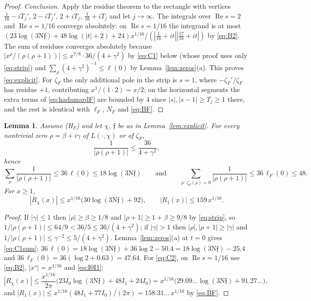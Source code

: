 \documentclass[11pt]{article}
\newtheorem{lemma}{Lemma}[section]
\theoremstyle{definition}
\theoremstyle{remark}
\numberwithin{equation}{section}
\newcommand{\ff}{\mathfrak f}
\newcommand{\Nm}{\mathrm N}
\newcommand{\Rea}{\operatorname{Re}}
\newcommand{\HF}{\textup{(H$_F$)}}
\begin{document}
\begin{proof}
\emph{Conclusion.} Apply the residue theorem to the rectangle with vertices $\tfrac1{16}-iT_j'$, $2-iT_j'$, $2+iT_j$, $\tfrac1{16}+iT_j$ and let $j\to\infty$. The integrals over $\Rea s=2$ and $\Rea s=1/16$ converge absolutely: on $\Rea s=1/16$ the integrand is at most $(23\log(3\Nm\ff)+48\log(|t|+2)+24)x^{1/16}/(|\tfrac1{16}+it||\tfrac{17}{16}+it|)$ by \eqref{eq:B2}. The sum of residues converges absolutely because $|x^\rho/(\rho(\rho+1))|\le x^{7/8}\cdot36/(4+\gamma^2)$ by \eqref{eq:C1} below (whose proof uses only \eqref{eq:strip}) and $\sum_\rho(4+\gamma^2)^{-1}\le\ell(0)$ by Lemma~\ref{lem:zeros}(a). This proves \eqref{eq:explicit}. For $\zeta_F$ the only additional pole in the strip is $s=1$, where $-\zeta_F'/\zeta_F$ has residue $+1$, contributing $x^1/(1\cdot2)=x/2$; on the horizontal segments the extra terms of \eqref{eq:hadamardF} are bounded by $4$ since $|s|,|s-1|\ge T_j\ge1$ there, and the rest is identical with $\ell_F$, $N_F$ and \eqref{eq:BF}.
\end{proof}

\begin{lemma}\label{lem:bounds}
Assume \HF{} and let $\chi$, $\ff$ be as in Lemma~\ref{lem:explicit}. For every nontrivial zero $\rho=\beta+i\gamma$ of $L(\cdot,\chi)$ or of $\zeta_F$,
\begin{equation}\label{eq:C1}
 \frac1{|\rho(\rho+1)|}\le\frac{36}{4+\gamma^2},
\end{equation}
hence
\begin{equation}\label{eq:C1sum}
 \sum_\rho\frac1{|\rho(\rho+1)|}\le36\,\ell(0)\le18\log(3\Nm\ff)\qquad\text{and}\qquad\sum_{\rho:\,\zeta_F(\rho)=0}\frac1{|\rho(\rho+1)|}\le36\,\ell_F(0)\le48 .
\end{equation}
For $x\ge1$,
\begin{equation}\label{eq:C2}
 |R_\chi(x)|\le x^{1/16}\bigl(30\log(3\Nm\ff)+92\bigr),\qquad|R_1(x)|\le159\,x^{1/16}.
\end{equation}
\end{lemma}

\begin{proof}
If $|\gamma|\le1$ then $|\rho|\ge\beta\ge1/8$ and $|\rho+1|\ge1+\beta\ge9/8$ by \eqref{eq:strip}, so $1/|\rho(\rho+1)|\le64/9<36/5\le36/(4+\gamma^2)$; if $|\gamma|>1$ then $|\rho|,|\rho+1|\ge|\gamma|$ and $1/|\rho(\rho+1)|\le\gamma^{-2}\le5/(4+\gamma^2)$. Lemma~\ref{lem:zeros}(a) at $t=0$ gives \eqref{eq:C1sum}: $36\,\ell(0)=18\log(3\Nm\ff)+36\log2-50.4=18\log(3\Nm\ff)-25.4$ and $36\,\ell_F(0)=36(\log2+0.63)=47.64$. For \eqref{eq:C2}, on $\Rea s=1/16$ use \eqref{eq:B2}, $|x^s|=x^{1/16}$ and \eqref{eq:I0I1}:
\[
 |R_\chi(x)|\le\frac{x^{1/16}}{2\pi}\bigl(23I_0\log(3\Nm\ff)+48I_1+24I_0\bigr)=x^{1/16}\bigl(29.09\ldots\log(3\Nm\ff)+91.27\ldots\bigr),
\]
and $|R_1(x)|\le x^{1/16}(48I_1+77I_0)/(2\pi)=158.31\ldots\,x^{1/16}$ by \eqref{eq:BF}.
\end{proof}
\end{document}
